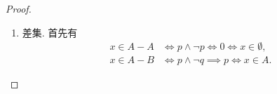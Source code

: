 \begin{property}
\begin{proof}
\begin{enumerate}
            对\cref{equation:集合论.集合代数公式6-8}，
            将子集关系展开为全称命题，
            得到
            \begin{align*}
                (A\subseteq C)\land(B\subseteq C)
                &\iff(\forall x)[(x\in A\limp x\in C)\land(x\in B\limp x\in C)] \\
                &\iff(\forall x)[(x\in A\lor x\in B)\limp x\in C]
                \tag{蕴含化为析取、分配律}\\
                &\iff A\cup B\subseteq C.
            \end{align*}
            第一步使用了全称量词对合取的分配：两条命题对每个\(x\)分别成立，
            当且仅当它们的合取对每个\(x\)成立.
            同理，
            对于\cref{equation:集合论.集合代数公式6-9}，
            有
            \begin{align*}
                (A\subseteq B)\land(A\subseteq C)
                &\iff(\forall x)[(x\in A\limp x\in B)\land(x\in A\limp x\in C)] \\
                &\iff(\forall x)[x\in A\limp(x\in B\land x\in C)]
                \tag{蕴含化为析取、分配律}\\
                &\iff A\subseteq B\cap C.
            \end{align*}

            最后一个对称差包含式用逆否命题证明.
            若\(x\notin(A\symdiff C)\cup(B\symdiff D)\)，
            则
            \begin{align*}
                x\notin(A\symdiff C)\cup(B\symdiff D)
                &\iff\neg(p\lxor r)\land\neg(q\lxor s) \tag{德摩根律}\\
                &\iff(p\liff r)\land(q\liff s) \tag{异或与等价的关系}\\
                &\implies(p\lor q)\liff(r\lor s) \tag{析取的真值}\\
                &\iff\neg\bigl((p\lor q)\lxor(r\lor s)\bigr) \\
                &\iff x\notin(A\cup B)\symdiff(C\cup D).
            \end{align*}
            取逆否命题，
            便得到所需包含关系.

            \item 差集.
            首先有
            \begin{align*}
                x\in A-A
                &\iff p\land\neg p\iff0\iff x\in\emptyset, \tag{互补律}\\
                x\in A-B
                &\iff p\land\neg q\implies p\iff x\in A. \tag{合取的化简}
            \end{align*}


\end{enumerate}
\end{proof}
\end{property}
